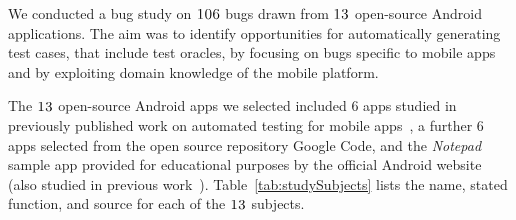 \label{study}


We conducted a bug study on $\textsc{106}$ bugs drawn from $\textsc{13}$ open-source Android applications. The aim was to identify opportunities for automatically generating test cases, that include test oracles, by focusing on bugs specific to mobile apps and by exploiting domain knowledge of the mobile platform.

The $\textsc{13}$ open-source Android apps we selected %
included $6$ apps studied in previously published work on automated testing for mobile apps~\cite{Hu:2011:AST,AmalfitanoASE2012,Nguyen:2012:ISSTA}, a further $6$ apps selected from the open source repository Google Code, and the \textit{Notepad} sample app provided for educational purposes by the official Android website (also studied in previous work~\cite{Nguyen:2012:ISSTA}). Table~\ref{tab:studySubjects} lists the name, stated function, and source for each of the $\textsc{13}$ subjects.


